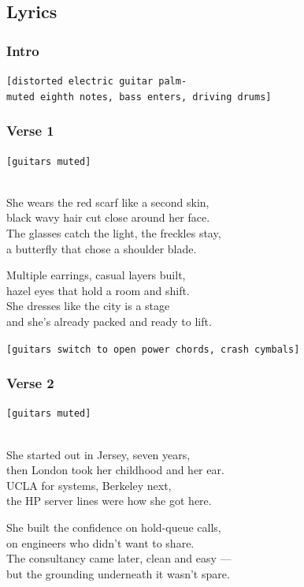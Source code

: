 \documentclass[]{article}
\begin{document}
\subsection{Lyrics}\label{lyrics-21}

\subsubsection{Intro}\label{intro-9}

\texttt{{[}distorted\ electric\ guitar\ palm-muted\ eighth\ notes,\ bass\ enters,\ driving\ drums{]}}

\subsubsection{Verse 1}\label{verse-1-13}

\texttt{{[}guitars\ muted{]}}\strut \\
She wears the red scarf like a second skin,\\
black wavy hair cut close around her face.\\
The glasses catch the light, the freckles stay,\\
a butterfly that chose a shoulder blade.

Multiple earrings, casual layers built,\\
hazel eyes that hold a room and shift.\\
She dresses like the city is a stage\\
and she's already packed and ready to lift.

\texttt{{[}guitars\ switch\ to\ open\ power\ chords,\ crash\ cymbals{]}}

\subsubsection{Verse 2}\label{verse-2-10}

\texttt{{[}guitars\ muted{]}}\strut \\
She started out in Jersey, seven years,\\
then London took her childhood and her ear.\\
UCLA for systems, Berkeley next,\\
the HP server lines were how she got here.

She built the confidence on hold-queue calls,\\
on engineers who didn't want to share.\\
The consultancy came later, clean and easy ---\\
but the grounding underneath it wasn't spare.
\end{document}
